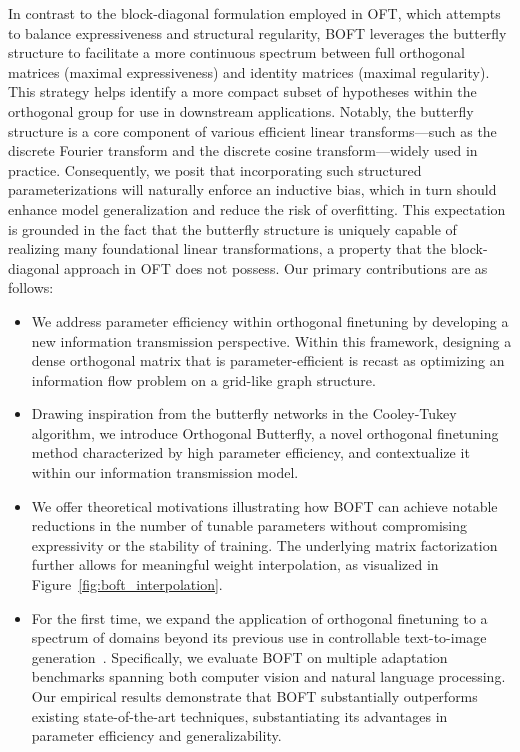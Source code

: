 In contrast to the block-diagonal formulation employed in OFT, which attempts to balance expressiveness and structural regularity, BOFT leverages the butterfly structure to facilitate a more continuous spectrum between full orthogonal matrices (maximal expressiveness) and identity matrices (maximal regularity). This strategy helps identify a more compact subset of hypotheses within the orthogonal group for use in downstream applications. Notably, the butterfly structure is a core component of various efficient linear transforms—such as the discrete Fourier transform and the discrete cosine transform—widely used in practice. Consequently, we posit that incorporating such structured parameterizations will naturally enforce an inductive bias, which in turn should enhance model generalization and reduce the risk of overfitting. This expectation is grounded in the fact that the butterfly structure is uniquely capable of realizing many foundational linear transformations, a property that the block-diagonal approach in OFT does not possess. Our primary contributions are as follows:

\begin{itemize}[leftmargin=*,nosep]
    \item We address parameter efficiency within orthogonal finetuning by developing a new information transmission perspective. Within this framework, designing a dense orthogonal matrix that is parameter-efficient is recast as optimizing an information flow problem on a grid-like graph structure.
    \item Drawing inspiration from the butterfly networks in the Cooley-Tukey algorithm, we introduce Orthogonal Butterfly, a novel orthogonal finetuning method characterized by high parameter efficiency, and contextualize it within our information transmission model.
    \item We offer theoretical motivations illustrating how BOFT can achieve notable reductions in the number of tunable parameters without compromising expressivity or the stability of training. The underlying matrix factorization further allows for meaningful weight interpolation, as visualized in Figure~\ref{fig:boft_interpolation}.
    \item For the first time, we expand the application of orthogonal finetuning to a spectrum of domains beyond its previous use in controllable text-to-image generation~\cite{qiu2023controlling}. Specifically, we evaluate BOFT on multiple adaptation benchmarks spanning both computer vision and natural language processing. Our empirical results demonstrate that BOFT substantially outperforms existing state-of-the-art techniques, substantiating its advantages in parameter efficiency and generalizability.
\end{itemize}

